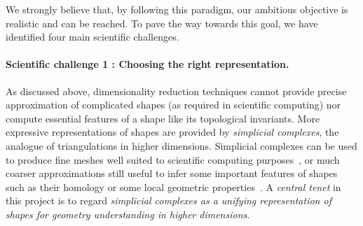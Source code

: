 We strongly believe that, by following this paradigm,  our ambitious objective is realistic and can be reached. To pave the way towards this goal, we have identified  four main scientific challenges.


\vspace{-1mm}

\paragraph{Scientific challenge 1 :  Choosing the right representation.}


As discussed above, dimensionality reduction techniques cannot provide precise approximation of complicated shapes (as required in scientific computing) nor compute essential features of a shape like its topological invariants.
More expressive representations of shapes are provided %
by {\em simplicial complexes}, the analogue of triangulations in higher dimensions.
 Simplicial complexes can be used to produce fine meshes well suited to scientific computing purposes~\cite{mh-mpc-2002,boissonnat2010meshing}, or much coarser approximations still useful to infer some important features of shapes such as their homology or some local geometric properties~\cite{geometrica-ccl09,nsw-fhm-2008}. 
 A {\em central tenet} in this project is to regard {\em simplicial complexes as a unifying representation of shapes for geometry understanding in higher dimensions}.%


